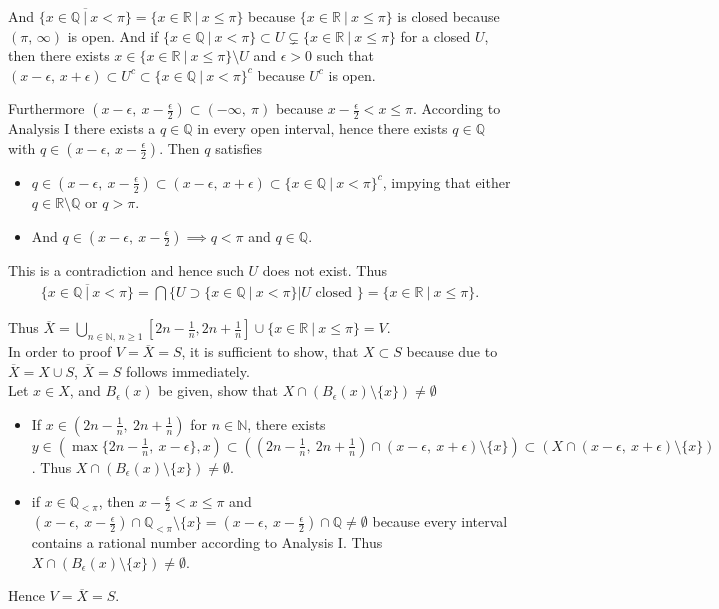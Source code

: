 \documentclass{article}
\begin{document}
And $\overline{\{x \in \mathbb{Q} \ | \ x < \pi\}} = \{x \in \mathbb{R} \ | \ x \leq \pi\}$ because $\{x \in \mathbb{R} \ | \ x \leq \pi\}$ is closed because $( \pi ,\, \infty)$ is open.
And if $\{x \in \mathbb{Q} \ | \ x < \pi\} \subset U \subsetneq \{x \in \mathbb{R} \ | \ x \leq \pi\}$ for a closed $U$, then there exists $x \in \{x \in \mathbb{R} \ | \ x \leq \pi\} \setminus U$ and $\epsilon > 0$ such that $(x- \epsilon ,\, x + \epsilon) \subset U^{c} \subset \{x \in \mathbb{Q} \ | \ x < \pi\}^{c}$ because $U^{c}$ is open.

Furthermore $(x - \epsilon ,\ x- \frac{\epsilon}{2}) \subset (-\infty ,\ \pi)$ because $x - \frac{\epsilon}{2} < x \leq \pi$.
According to Analysis I there exists a $q \in \mathbb{Q}$ in every open interval, hence there exists $q \in \mathbb{Q}$ with $q \in (x - \epsilon ,\, x - \frac{\epsilon}{2})$.
Then $q$ satisfies
\begin{itemize}
\item $q \in (x-\epsilon ,\ x - \frac{\epsilon}{2}) \subset (x - \epsilon ,\ x+ \epsilon) \subset \{x \in \mathbb{Q} \ | \ x < \pi\}^{c}$, impying that either $ q \in \mathbb{R} \setminus \mathbb{Q}$ or $q > \pi$.
\item And $q \in (x-\epsilon ,\ x - \frac{\epsilon}{2}) \implies q < \pi$ and $q \in \mathbb{Q}$.
\end{itemize}
This is a contradiction and hence such $U$ does not exist.
Thus 
\begin{align*}
  \overline{\{x \in \mathbb{Q} \ | \ x < \pi\}} = \bigcap \{U \supset \{ x \in \mathbb{Q} \ | \ x < \pi\} | U \text{ closed } \} = \{x \in \mathbb{R} \ | \ x \leq \pi\}.
\end{align*}

Thus $\overline{X} = \bigcup_{n \in \mathbb{N} ,\, n \geq 1} [2n-\frac{1}{n}, 2n + \frac{1}{n}] \cup \{x \in \mathbb{R} \ | \ x \leq \pi\} = V$.\\
In order to proof $V = \overline{X} = S$, it is sufficient to show, that $X \subset S$ because due to $\overline{X} = X \cup S$, $\overline{X} = S$ follows immediately.\\
Let $x \in X$, and $B_{\epsilon}(x)$ be given, show that $X \cap (B_{\epsilon}(x) \setminus \{x\}) \neq \emptyset$
\begin{itemize}
\item If $x \in (2n - \frac{1}{n} ,\ 2n + \frac{1}{n})$ for $n \in \mathbb{N}$, there exists $y \in (\max\{2n - \frac{1}{n},\ x - \epsilon\}, x) \subset ((2n - \frac{1}{n} ,\ 2n + \frac{1}{n}) \cap (x-\epsilon ,\ x+ \epsilon) \setminus \{x\}) \subset (X \cap (x-\epsilon ,\ x+ \epsilon) \setminus \{x\})$.
  Thus $X \cap (B_{\epsilon}(x) \setminus \{x\}) \neq \emptyset$.
\item if $x \in \mathbb{Q}_{<\pi}$, then $x-\frac{\epsilon}{2} < x \leq \pi$ and $(x - \epsilon ,\ x - \frac{\epsilon}{2}) \cap \mathbb{Q}_{<\pi} \setminus \{x\} = (x - \epsilon ,\ x - \frac{\epsilon}{2}) \cap \mathbb{Q} \neq \emptyset$ because every interval contains a rational number according to Analysis I.
  Thus $X \cap (B_{\epsilon}(x) \setminus \{x\}) \neq \emptyset$.
\end{itemize}
Hence $V = \overline{X} = S$.
\end{document}
